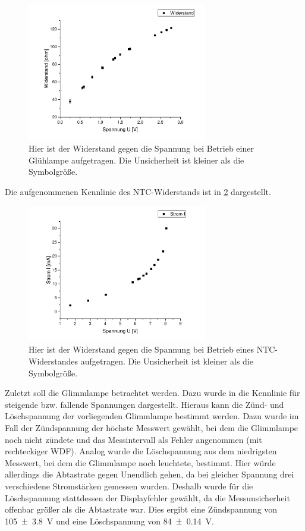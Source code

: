 \documentclass[
	a4paper,
	12pt,
	pagesize,
	ngerman
]{scrartcl}
\begin{document}
	\begin{figure}[H]
		\includegraphics[width=0.7\textwidth]{Glueh_Wider}
		\centering
		\caption{Hier ist der Widerstand gegen die Spannung bei Betrieb einer Glühlampe aufgetragen. Die Unsicherheit ist kleiner als die Symbolgröße.}
		\label{Glueh_Wider}
		\centering
	\end{figure}
	Die aufgenommenen Kennlinie des NTC-Widerstands ist in \cref{ntc} dargestellt.
	\begin{figure}[H]
		\includegraphics[width=0.7\textwidth]{ntc}
		\centering
		\caption{Hier ist der Widerstand gegen die Spannung bei Betrieb eines NTC-Widerstandes aufgetragen. Die Unsicherheit ist kleiner als die Symbolgröße.}
		\label{ntc}
		\centering
	\end{figure}
	Zuletzt soll die Glimmlampe betrachtet werden.
	Dazu wurde in  die Kennlinie für steigende bzw. fallende Spannungen dargestellt.
	Hieraus kann die Zünd- und Löschspannung der vorliegenden Glimmlampe bestimmt werden.
	Dazu wurde im Fall der Zündspannung der höchste Messwert gewählt, bei dem die Glimmlampe noch nicht zündete und das Messintervall als Fehler angenommen (mit rechteckiger WDF).
	Analog wurde die Löschspannung aus dem niedrigsten Messwert, bei dem die Glimmlampe noch leuchtete, bestimmt.
	Hier würde allerdings die Abtastrate gegen Unendlich gehen, da bei gleicher Spannung drei verschiedene Stromstärken gemessen wurden.
	Deshalb wurde für die Löschspannung stattdessen der Displayfehler gewählt, da die Messunsicherheit offenbar größer als die Abtastrate war.
	Dies ergibt eine Zündspannung von \SI{105\pm3,8}{V} und eine Löschspannung von \SI{84\pm 0,14}{V}.
	
\end{document}
